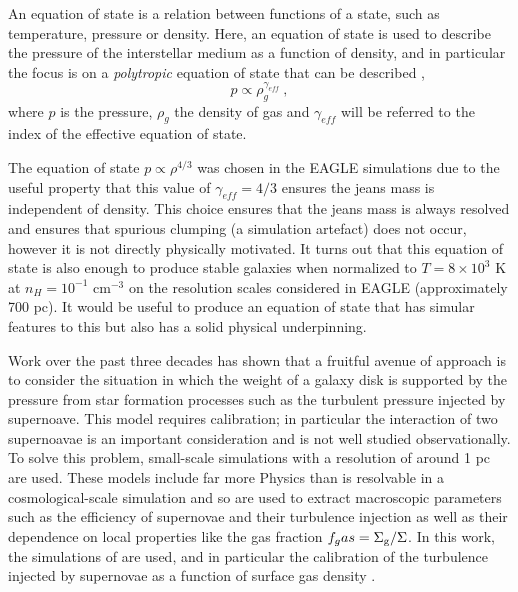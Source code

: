 An equation of state is a relation between functions of a state, such as temperature, pressure or density. 
Here, an equation of state is used to describe the pressure of the interstellar medium as a function of density, and in particular the focus is on a \emph{polytropic} equation of state that can be described \citep{horedt_polytropes:_2004},
\begin{equation}
\label{eqn:polytrope}
p \propto \rho_g ^ {\gamma_{eff}}~,
\end{equation}
where $p$ is the pressure, $\rho_g$ the density of gas and $\gamma_{eff}$ will be referred to the index of the effective equation of state.

The equation of state $p \propto \rho^{4/3}$ was chosen in the EAGLE simulations \citep{schaye_eagle_2015} due to the useful property that this value of $\gamma_{eff} = 4/3$ ensures the jeans mass is independent of density.
This choice ensures that the jeans mass is always resolved and ensures that spurious clumping (a simulation artefact) does not occur, however it is not directly physically motivated.
It turns out that this equation of state is also enough to produce stable galaxies when normalized to $T = 8\times 10^3$ K at $n_H = 10^{-1}$ cm$^{-3}$ on the resolution scales considered in EAGLE (approximately 700 pc).
It would be useful to produce an equation of state that has simular features to this but also has a solid physical underpinning.

Work over the past three decades has shown that a fruitful avenue of approach is to consider the situation in which the weight of a galaxy disk is supported by the pressure from star formation processes such as the turbulent pressure injected by supernoave. 
This model requires calibration; in particular the interaction of two supernoavae is an important consideration and is not well studied observationally.
To solve this problem, small-scale simulations with a resolution of around 1 pc \citep{martizzi_supernova_2015} are used.
These models include far more Physics than is resolvable in a cosmological-scale simulation and so are used to extract macroscopic parameters such as the efficiency of supernovae and their turbulence injection as well as their dependence on local properties like the gas fraction $f_gas = \Sigma_\mathrm{g}/\Sigma$.
In this work, the simulations of \citet{martizzi_supernova_2015} are used, and in particular the calibration of the turbulence injected by supernovae as a function of surface gas density \citep{martizzi_supernova_2016}.

